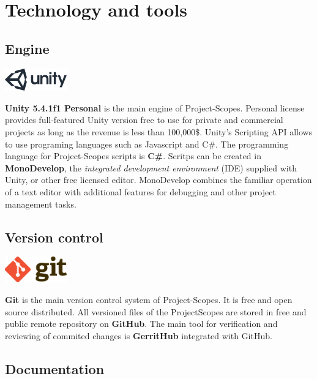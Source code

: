 \section{Technology and tools}

\subsection{Engine}
\begin{center}
	\includegraphics[width=0.2\textwidth]{tools-imgs/engineLogo}
\end{center}
\noindent\textbf{Unity 5.4.1f1 Personal} is the main engine of Project-Scopes. Personal license provides full-featured Unity version free to use for private and commercial projects as long as the revenue is less than 100,000\$. Unity's Scripting API allows to use programing languages such as Javascript and C\#. The programming language for Project-Scopes scripts is \textbf{C\#}. Scritps can be created in \textbf{MonoDevelop}, the \textit{integrated development environment} (IDE) supplied with Unity, or other free licensed editor. MonoDevelop combines the familiar operation of a text editor with additional features for debugging and other project management tasks.

\subsection{Version control}
\begin{center}
	\includegraphics[width=0.2\textwidth]{tools-imgs/vcLogo}
\end{center}
\noindent\textbf{Git} is the main version control system of Project-Scopes. It is free and open source distributed. All versioned files of the ProjectScopes are stored in free and public remote repository on \textbf{GitHub}. The main tool for verification and reviewing of commited changes is \textbf{GerritHub} integrated with GitHub.

\subsection{Documentation}

